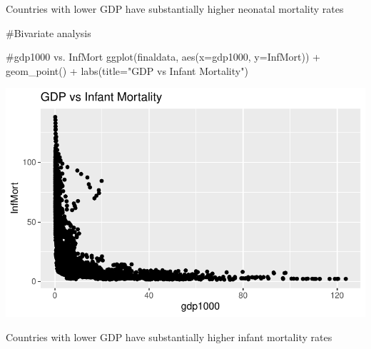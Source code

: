\documentclass[
  letterpaper,
  DIV=11,
  numbers=noendperiod]{scrartcl}
\newenvironment{Shaded}{\begin{snugshade}}{\end{snugshade}}
\newcommand{\AttributeTok}[1]{\textcolor[rgb]{0.40,0.45,0.13}{#1}}
\newcommand{\CommentTok}[1]{\textcolor[rgb]{0.37,0.37,0.37}{#1}}
\newcommand{\FunctionTok}[1]{\textcolor[rgb]{0.28,0.35,0.67}{#1}}
\newcommand{\NormalTok}[1]{\textcolor[rgb]{0.00,0.23,0.31}{#1}}
\newcommand{\SpecialCharTok}[1]{\textcolor[rgb]{0.37,0.37,0.37}{#1}}
\newcommand{\StringTok}[1]{\textcolor[rgb]{0.13,0.47,0.30}{#1}}
\begin{document}
Countries with lower GDP have substantially higher neonatal mortality
rates

\begin{Shaded}
\begin{Highlighting}[]
\CommentTok{\#Bivariate analysis}

\CommentTok{\#gdp1000 vs. InfMort}
\FunctionTok{ggplot}\NormalTok{(finaldata, }\FunctionTok{aes}\NormalTok{(}\AttributeTok{x=}\NormalTok{gdp1000, }\AttributeTok{y=}\NormalTok{InfMort)) }\SpecialCharTok{+} 
  \FunctionTok{geom\_point}\NormalTok{() }\SpecialCharTok{+} 
  \FunctionTok{labs}\NormalTok{(}\AttributeTok{title=}\StringTok{"GDP vs Infant Mortality"}\NormalTok{)}
\end{Highlighting}
\end{Shaded}

\includegraphics{week4_eda_inclass_files/figure-pdf/unnamed-chunk-11-1.pdf}

Countries with lower GDP have substantially higher infant mortality
rates
\end{document}
